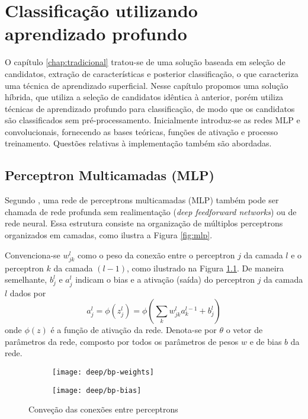 \chapter{Classificação utilizando aprendizado profundo} \label{chap:class-profundo}
O capítulo \ref{chap:tradicional} tratou-se de uma solução baseada em seleção de candidatos, extração de características e posterior classificação, o que caracteriza uma técnica de aprendizado superficial. Nesse capítulo propomos uma solução híbrida, que utiliza a seleção de candidatos idêntica à anterior, porém utiliza técnicas de aprendizado profundo para classificação, de modo que os candidatos são classificados sem pré-processamento. Inicialmente introduz-se as redes MLP e convolucionais, fornecendo as bases teóricas, funções de ativação e processo treinamento.  Questões relativas à implementação também são abordadas.

\section{Perceptron Multicamadas (MLP)}

Segundo \cite{DLbook}, uma rede de perceptrons multicamadas (MLP) também pode ser chamada de rede profunda sem realimentação (\textit{deep feedforward networks}) ou de rede neural. Essa estrutura consiste na organização de múltiplos perceptrons organizados em camadas, como ilustra a Figura \ref{fig:mlp}. 
 
Convenciona-se $w_{jk}^l$ como o peso da conexão entre o perceptron $j$ da camada $l$ e o perceptron $k$ da camada $(l-1)$, como ilustrado na Figura \ref{fig:bp}. De maneira semelhante, $b^l_j$ e $a^l_j$ indicam o bias e a ativação (saída) do perceptron $j$ da camada $l$ dados por
\begin{equation}
a^l_j = \phi (z^l_j) =\phi \left( \sum_k w_{jk}^l a_k^{l-1} + b_j^l \right)
\end{equation}
onde $\phi(z)$ é a função de ativação da rede. Denota-se por $\theta$ o vetor de parâmetros da rede, composto por todos os parâmetros de pesos $w$ e de bias $b$ da rede.

\begin{figure}
\centering
\begin{subfigure}{.5\textwidth}
  \centering
  \texttt{[image: deep/bp-weights]}
\end{subfigure}%
\begin{subfigure}{.5\textwidth}
  \centering
  \texttt{[image: deep/bp-bias]}
\end{subfigure}
\caption{Conveção das conexões entre perceptrons}
\label{fig:bp}
\end{figure}

